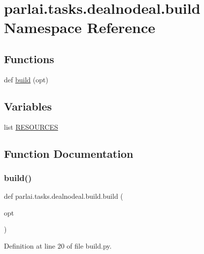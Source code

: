 \hypertarget{namespaceparlai_1_1tasks_1_1dealnodeal_1_1build}{}\section{parlai.\+tasks.\+dealnodeal.\+build Namespace Reference}
\label{namespaceparlai_1_1tasks_1_1dealnodeal_1_1build}
\subsection*{Functions}
\begin{DoxyCompactItemize}
\item 
def \hyperlink{namespaceparlai_1_1tasks_1_1dealnodeal_1_1build_a964c2b43bf49102b9541d584d10d8632}{build} (opt)
\end{DoxyCompactItemize}
\subsection*{Variables}
\begin{DoxyCompactItemize}
\item 
list \hyperlink{namespaceparlai_1_1tasks_1_1dealnodeal_1_1build_a241dcbf765e96f5beed61989453698a9}{R\+E\+S\+O\+U\+R\+C\+ES}
\end{DoxyCompactItemize}


\subsection{Function Documentation}
\mbox{\label{namespaceparlai_1_1tasks_1_1dealnodeal_1_1build_a964c2b43bf49102b9541d584d10d8632}} 
\subsubsection{\texorpdfstring{build()}{build()}}
{\footnotesize\ttfamily def parlai.\+tasks.\+dealnodeal.\+build.\+build (\begin{DoxyParamCaption}\item[{}]{opt }\end{DoxyParamCaption})}



Definition at line 20 of file build.\+py.


